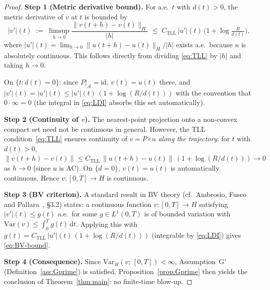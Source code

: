 \documentclass[12pt,a4paper]{article}
\theoremstyle{definition}
\theoremstyle{plain}
\theoremstyle{remark}
\begin{document}
\begin{proof}
\textbf{Step 1 (Metric derivative bound).}\;
For a.e.\ $t$ with $d(t)>0$, the metric derivative of $v$ at $t$
is bounded by
\[
  |v'|(t)
  \;:=\;
  \limsup_{h\to 0}\frac{\|v(t+h)-v(t)\|_H}{|h|}
  \;\le\;
  C_{\mathrm{TLL}}\,|u'|(t)\,
  \bigl(1 + \log\tfrac{R}{d(t)}\bigr),
\]
where $|u'|(t) = \lim_{h\to 0}\|u(t+h)-u(t)\|_H/|h|$ exists a.e.\
because $u$ is absolutely continuous.  This follows directly from
dividing \eqref{eq:TLL} by $|h|$ and taking $h\to 0$.

On $\{t : d(t)=0\}$: since $P|_{\mathcal{A}} = \mathrm{id}$,
$v(t) = u(t)$ there, and $|v'|(t) = |u'|(t) \le |u'|(t)\,
(1+\log(R/d(t)))$ with the convention that $0 \cdot \infty = 0$
(the integral in \eqref{eq:LDI} absorbs this set automatically).

\medskip
\noindent
\textbf{Step 2 (Continuity of $v$).}\;
The nearest-point projection onto a non-convex compact set need not be
continuous in general.  However, the TLL condition~\eqref{eq:TLL}
ensures continuity of $v = P\circ u$ \emph{along the trajectory}:
for $t$ with $d(t) > 0$,
$\|v(t+h)-v(t)\| \le C_{\mathrm{TLL}}\,\|u(t+h)-u(t)\|\,
(1+\log(R/d(t))) \to 0$ as $h \to 0$
(since $u$ is AC).  On $\{d=0\}$, $v(t)=u(t)$ is automatically
continuous.  Hence $v: [0,T] \to H$ is continuous.

\medskip
\noindent
\textbf{Step 3 (BV criterion).}\;
A standard result in BV theory (cf.\ Ambrosio, Fusco and
Pallara~\cite{AmbrosioFuscoPallara2000}, \S3.2) states: a continuous
function $v: [0,T] \to H$ satisfying
$|v'|(t) \le g(t)$ a.e.\ for some $g \in L^1(0,T)$ is of bounded
variation with $\mathrm{Var}(v) \le \int_0^T g(t)\,\mathrm{d}t$.
Applying this with $g(t) = C_{\mathrm{TLL}}\,|u'|(t)\,
(1+\log(R/d(t)))$ (integrable by \eqref{eq:LDI}) gives
\eqref{eq:BV-bound}.

\medskip
\noindent
\textbf{Step 4 (Consequence).}\;
Since $\mathrm{Var}_H(v;\,[0,T]) < \infty$, Assumption~G$'$
(Definition~\ref{ass:Gprime}) is satisfied.
Proposition~\ref{prop:Gprime} then yields the conclusion of
Theorem~\ref{thm:main}: no finite-time blow-up.
\end{proof}
\end{document}
